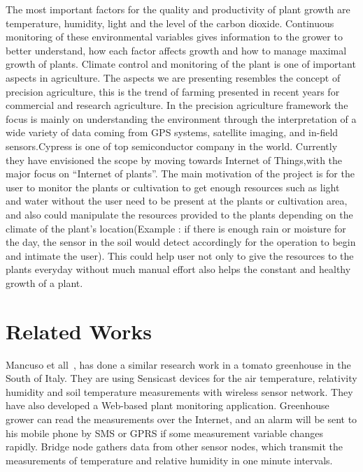 \documentclass[10pt]{article}
\begin{document}
The most important factors for the quality and productivity of plant growth are temperature, humidity, light and the level of the carbon dioxide. 
Continuous monitoring of these environmental variables gives information to the grower to better understand, how each factor affects growth and how to manage maximal growth of plants. 
Climate control and monitoring of the plant is one of important aspects in agriculture. 
The aspects we are presenting resembles the concept of precision agriculture, this is the trend of farming presented in recent years for commercial and research agriculture. 
In the precision agriculture framework the focus is mainly on understanding the environment through the interpretation of a wide variety of data coming from GPS systems, satellite imaging, and in-field sensors.Cypress is one of top semiconductor company in the world. Currently they have envisioned the scope by moving towards Internet of Things,with the major focus on ``Internet of plants''.  
The main motivation of the project is for the user to monitor the plants or cultivation to get enough resources such as light and water without the user need to be present at the plants or cultivation area, and also could manipulate the resources provided to the plants depending on the climate of the plant's location(Example : if there is enough rain or moisture for the day, the sensor in the soil would detect accordingly for the operation to begin and intimate the user).
This could help user not only to give the resources to the plants everyday without much manual effort also helps the constant and healthy growth of a plant.


\section*{Related Works}




Mancuso et all~\cite{ref003}, has done a similar research work in a tomato greenhouse in the South of Italy. 
They are using Sensicast devices for the air temperature, relativity humidity and soil temperature measurements with wireless sensor network. 
They have also developed a Web-based plant monitoring application. 
Greenhouse grower can read the measurements over the Internet, and an alarm will be sent to his mobile phone by SMS or GPRS if some measurement variable changes rapidly. 
Bridge node gathers data from other sensor nodes, which transmit the measurements of temperature and relative humidity in one minute intervals. 
\end{document}
